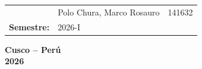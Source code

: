 \documentclass[12pt,a4paper]{book}
\begin{document}
\begin{titlepage}
\begin{center}
\begin{tabular}{@{} l l l @{}}
        &
        Polo Chura, Marco Rosauro
        & 141632 \\[0.07cm]

        \textbf{\fontsize{14}{14}\selectfont Semestre:}
        & \multicolumn{2}{l}{2026-I} \\

    \end{tabular}

    \vfill

    {\large \textbf{Cusco -- Perú}} \\[0.1cm]
    {\large \textbf{2026}}

\end{center}

\end{titlepage}
\clearpage
\hypersetup{pageanchor=true}
\pagestyle{toc}

\pagestyle{content}






\end{document}
